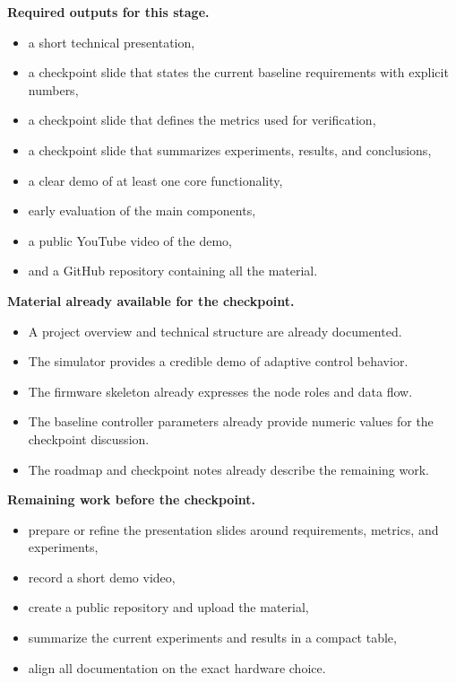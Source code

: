 \documentclass[11pt,a4paper]{article}
\begin{document}
\textbf{Required outputs for this stage.}

\begin{itemize}
    \item a short technical presentation,
    \item a checkpoint slide that states the current baseline requirements with explicit numbers,
    \item a checkpoint slide that defines the metrics used for verification,
    \item a checkpoint slide that summarizes experiments, results, and conclusions,
    \item a clear demo of at least one core functionality,
    \item early evaluation of the main components,
    \item a public YouTube video of the demo,
    \item and a GitHub repository containing all the material.
\end{itemize}

\textbf{Material already available for the checkpoint.}

\begin{itemize}
    \item A project overview and technical structure are already documented.
    \item The simulator provides a credible demo of adaptive control behavior.
    \item The firmware skeleton already expresses the node roles and data flow.
    \item The baseline controller parameters already provide numeric values for the checkpoint discussion.
    \item The roadmap and checkpoint notes already describe the remaining work.
\end{itemize}

\textbf{Remaining work before the checkpoint.}

\begin{itemize}
    \item prepare or refine the presentation slides around requirements, metrics, and experiments,
    \item record a short demo video,
    \item create a public repository and upload the material,
    \item summarize the current experiments and results in a compact table,
    \item align all documentation on the exact hardware choice.
\end{itemize}
\end{document}
